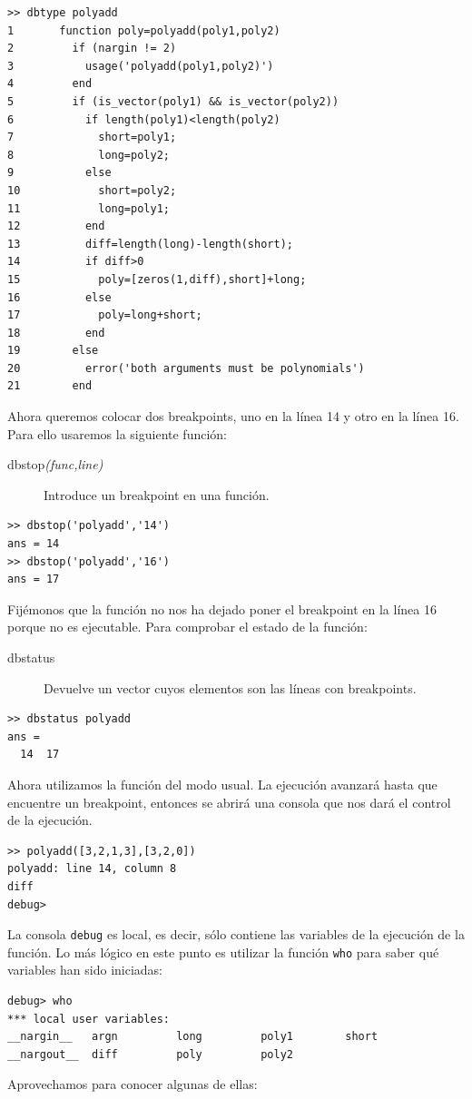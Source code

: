   \begin{verbatim}
>> dbtype polyadd
1       function poly=polyadd(poly1,poly2)
2         if (nargin != 2)
3           usage('polyadd(poly1,poly2)')
4         end
5         if (is_vector(poly1) && is_vector(poly2))
6           if length(poly1)<length(poly2)
7             short=poly1;
8             long=poly2;
9           else
10            short=poly2;
11            long=poly1;
12          end
13          diff=length(long)-length(short);
14          if diff>0
15            poly=[zeros(1,diff),short]+long;
16          else
17            poly=long+short;
18          end
19        else
20          error('both arguments must be polynomials')
21        end
\end{verbatim}
Ahora queremos colocar dos breakpoints, uno en la línea 14 y otro en
la línea 16. Para ello usaremos la siguiente función:

\begin{description}
\item [{dbstop\textsl{(func,line)}}]Introduce un
  breakpoint en una función.
\end{description}
\begin{verbatim}
>> dbstop('polyadd','14')
ans = 14
>> dbstop('polyadd','16')
ans = 17
\end{verbatim}
Fijémonos que la función no nos ha dejado poner el breakpoint en la
línea 16 porque no es ejecutable. Para comprobar el estado de la
función:

\begin{description}
\item [dbstatus]Devuelve un vector cuyos elementos son las líneas con
  breakpoints.
\end{description}
\begin{verbatim}
>> dbstatus polyadd
ans =
  14  17
\end{verbatim}
Ahora utilizamos la función del modo usual. La ejecución avanzará
hasta que encuentre un breakpoint, entonces se abrirá una consola que
nos dará el control de la ejecución.

  \begin{verbatim}
>> polyadd([3,2,1,3],[3,2,0])
polyadd: line 14, column 8
diff
debug>
\end{verbatim}
La consola \texttt{debug} es local, es decir, sólo contiene las
variables de la ejecución de la función. Lo más lógico en este punto
es utilizar la función \texttt{who} para saber qué variables han sido
iniciadas:

  \begin{verbatim}
debug> who
*** local user variables:
__nargin__   argn         long         poly1        short
__nargout__  diff         poly         poly2
\end{verbatim}
Aprovechamos para conocer algunas de ellas:

